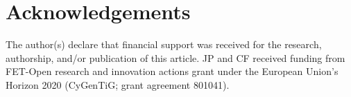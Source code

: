 \documentclass[fontsize=11pt,a4paper]{article}
\begin{document}
\section{Acknowledgements} 

The author(s) declare that financial support was received for the research, authorship, and/or
publication of this article.
JP and CF received funding from FET-Open research and innovation actions grant
under the European Union’s Horizon 2020 (CyGenTiG; grant agreement 801041).



\end{document}
